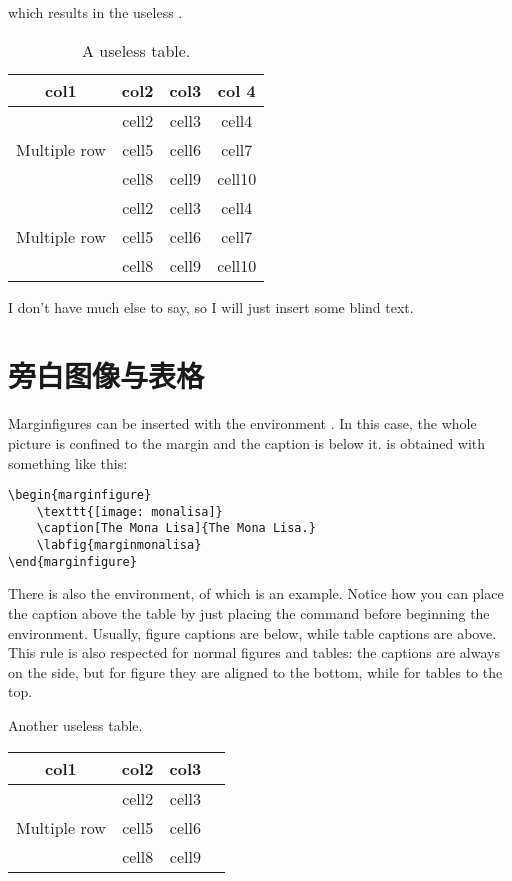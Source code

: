which results in the useless .

\begin{table}[ht]
\caption[A useless table]{A useless table.}
\begin{tabular}{ c c c c }
	\toprule
	col1 & col2 & col3 & col 4 \\
	\midrule
	\multirow{3}{4em}{Multiple row} & cell2 & cell3 & cell4\\ &
	cell5 & cell6 & cell7 \\ &
	cell8 & cell9 & cell10 \\
	\multirow{3}{4em}{Multiple row} & cell2 & cell3 & cell4 \\ &
	cell5 & cell6 & cell7 \\ &
	cell8 & cell9 & cell10 \\
	\bottomrule
\end{tabular}
\end{table}

I don't have much else to say, so I will just insert some blind text.
\blindtext

\section{旁白图像与表格}

Marginfigures can be inserted with the environment
. In this case, the whole picture is confined
to the margin and the caption is below it.  is
obtained with something like this:

\begin{lstlisting}[caption={Another caption.}]
\begin{marginfigure}
	\texttt{[image: monalisa]}
	\caption[The Mona Lisa]{The Mona Lisa.}
	\labfig{marginmonalisa}
\end{marginfigure}
\end{lstlisting}

There is also the  environment, of which
 is an example. Notice how you can place the
caption above the table by just placing the  command
before beginning the  environment. Usually, figure
captions are below, while table captions are above. This rule is also
respected for normal figures and tables: the captions are always on the
side, but for figure they are aligned to the bottom, while for tables to
the top.

\begin{margintable}
\caption[Another useless table]{Another useless table.}
\raggedright
\begin{tabular}{ c c c c }
	\hline
	col1 & col2 & col3 \\
	\hline
	\multirow{3}{4em}{Multiple row} & cell2 & cell3 \\ & cell5 & cell6
	\\ & cell8 & cell9 \\ \hline
\end{tabular}
\end{margintable}

